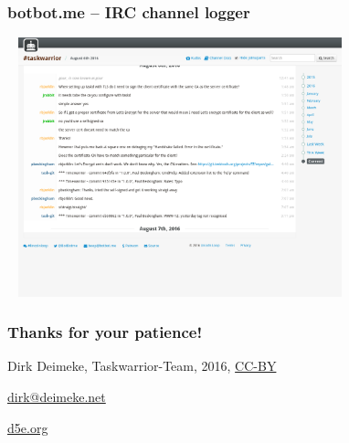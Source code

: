 \documentclass[t]{beamer}
\begin{document}
\begin{frame}\frametitle{botbot.me -- IRC channel logger}
    \begin{center}
        \href{https://botbot.me/freenode/taskwarrior/}{\includegraphics[width=10cm,height=7.5cm]{botbot-me-taskwarrior.png}}
    \end{center}
\end{frame}

\begin{frame}[fragile]\frametitle{Thanks for your patience!}
    \vfill
    \begin{center}
        Dirk Deimeke, Taskwarrior-Team, 2016, \href{https://creativecommons.org/licenses/by/4.0/}{CC-BY}

        \href{mailto:dirk@deimeke.net}{dirk@deimeke.net}

        \href{https://d5e.org/}{d5e.org}
    \end{center}
\end{frame}
\end{document}
